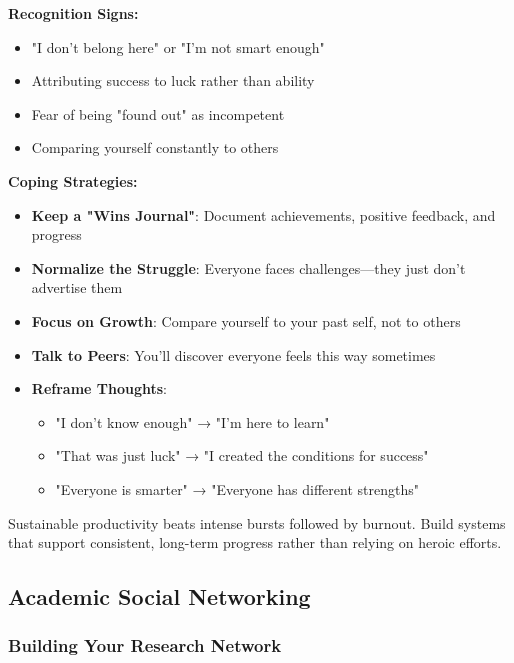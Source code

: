 \documentclass[11pt,a4paper]{article}
\begin{document}
\textbf{Recognition Signs:}
\begin{itemize}
    \item "I don't belong here" or "I'm not smart enough"
    \item Attributing success to luck rather than ability
    \item Fear of being "found out" as incompetent
    \item Comparing yourself constantly to others
\end{itemize}

\textbf{Coping Strategies:}
\begin{itemize}
    \item \textbf{Keep a "Wins Journal"}: Document achievements, positive feedback, and progress
    \item \textbf{Normalize the Struggle}: Everyone faces challenges—they just don't advertise them
    \item \textbf{Focus on Growth}: Compare yourself to your past self, not to others
    \item \textbf{Talk to Peers}: You'll discover everyone feels this way sometimes
    \item \textbf{Reframe Thoughts}: 
    \begin{itemize}
        \item "I don't know enough" → "I'm here to learn"
        \item "That was just luck" → "I created the conditions for success"
        \item "Everyone is smarter" → "Everyone has different strengths"
    \end{itemize}
\end{itemize}

\begin{tcolorbox}[colback=yellow!10,colframe=red!50,title={Remember: PhD is a Marathon, Not a Sprint}]
Sustainable productivity beats intense bursts followed by burnout. Build systems that support consistent, long-term progress rather than relying on heroic efforts.
\end{tcolorbox}

\subsection{Academic Social Networking}

\subsubsection{Building Your Research Network}
\end{document}
